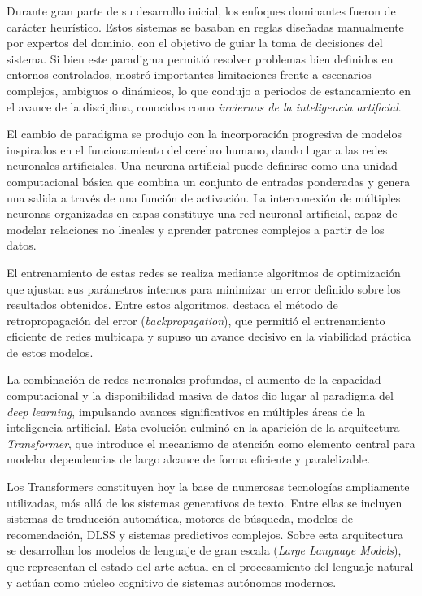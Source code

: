 Durante gran parte de su desarrollo inicial, los enfoques dominantes fueron de carácter heurístico. Estos sistemas se basaban en reglas diseñadas manualmente por expertos del dominio, con el objetivo de guiar la toma de decisiones del sistema. Si bien este paradigma permitió resolver problemas bien definidos en entornos controlados, mostró importantes limitaciones frente a escenarios complejos, ambiguos o dinámicos, lo que condujo a periodos de estancamiento en el avance de la disciplina, conocidos como \textit{inviernos de la inteligencia artificial}. \cite{russell2020}

El cambio de paradigma se produjo con la incorporación progresiva de modelos inspirados en el funcionamiento del cerebro humano, dando lugar a las redes neuronales artificiales. \cite{mcculloch1943}
Una neurona artificial puede definirse como una unidad computacional básica que combina un conjunto de entradas ponderadas y genera una salida a través de una función de activación. La interconexión de múltiples neuronas organizadas en capas constituye una red neuronal artificial, capaz de modelar relaciones no lineales y aprender patrones complejos a partir de los datos.

El entrenamiento de estas redes se realiza mediante algoritmos de optimización que ajustan sus parámetros internos para minimizar un error definido sobre los resultados obtenidos. Entre estos algoritmos, destaca el método de retropropagación del error (\textit{backpropagation}), que permitió el entrenamiento eficiente de redes multicapa y supuso un avance decisivo en la viabilidad práctica de estos modelos. \cite{rumelhart1986}

La combinación de redes neuronales profundas, el aumento de la capacidad computacional y la disponibilidad masiva de datos dio lugar al paradigma del \textit{deep learning}, impulsando avances significativos en múltiples áreas de la inteligencia artificial. \cite{goodfellow2016deep}
Esta evolución culminó en la aparición de la arquitectura \textit{Transformer}, que introduce el mecanismo de atención como elemento central para modelar dependencias de largo alcance de forma eficiente y paralelizable. \cite{vaswani2017}

Los Transformers constituyen hoy la base de numerosas tecnologías ampliamente utilizadas, más allá de los sistemas generativos de texto. Entre ellas se incluyen sistemas de traducción automática, motores de búsqueda, modelos de recomendación, DLSS y sistemas predictivos complejos.
Sobre esta arquitectura se desarrollan los modelos de lenguaje de gran escala (\textit{Large Language Models}), que representan el estado del arte actual en el procesamiento del lenguaje natural y actúan como núcleo cognitivo de sistemas autónomos modernos.




